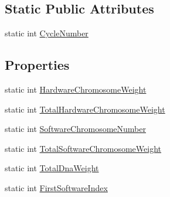 \subsection*{Static Public Attributes}
\begin{DoxyCompactItemize}
\item 
static int \hyperlink{classgearit_1_1src_1_1_genetic_algorithm_1_1_genome_1_1_raw_dna_a805951c3b52ce03b5b4206cd0d1bc935}{Cycle\+Number}
\end{DoxyCompactItemize}
\subsection*{Properties}
\begin{DoxyCompactItemize}
\item 
static int \hyperlink{classgearit_1_1src_1_1_genetic_algorithm_1_1_genome_1_1_raw_dna_a03464c0f505a70dca790c324a3625649}{Hardware\+Chromosome\+Weight}
\item 
static int \hyperlink{classgearit_1_1src_1_1_genetic_algorithm_1_1_genome_1_1_raw_dna_a688418dd02bffde8585e6b58eda34c7e}{Total\+Hardware\+Chromosome\+Weight}
\item 
static int \hyperlink{classgearit_1_1src_1_1_genetic_algorithm_1_1_genome_1_1_raw_dna_ab46bb6a8ebca0281eced0fdfe770f908}{Software\+Chromosome\+Number}
\item 
static int \hyperlink{classgearit_1_1src_1_1_genetic_algorithm_1_1_genome_1_1_raw_dna_a79c1a83ddfea4a887b926eb452116c4a}{Total\+Software\+Chromosome\+Weight}
\item 
static int \hyperlink{classgearit_1_1src_1_1_genetic_algorithm_1_1_genome_1_1_raw_dna_a30979bf5bf07c0071b4451f6bedfb616}{Total\+Dna\+Weight}
\item 
static int \hyperlink{classgearit_1_1src_1_1_genetic_algorithm_1_1_genome_1_1_raw_dna_a0c45853e89561d3eb2ed89f57e74d806}{First\+Software\+Index}
\end{DoxyCompactItemize}


